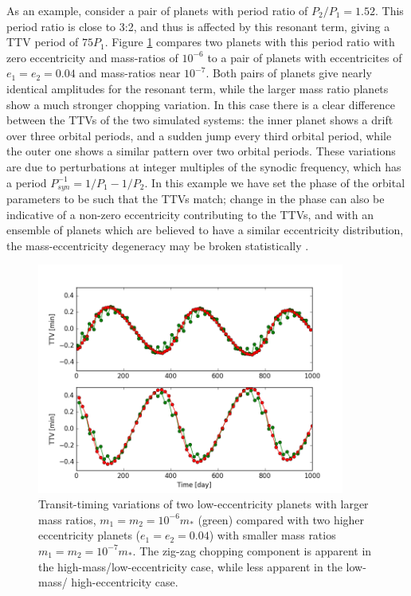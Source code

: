 \documentclass[graybox,natbib,nosecnum]{svmult}
\begin{document}
As an example, consider a pair of planets with period ratio of $P_2/P_1 = 1.52$.  This period ratio
is close to 3:2, and thus is affected by this resonant term, giving a TTV period of $75 P_1$.
Figure \ref{ttv_chopping} compares two planets with this period ratio with zero eccentricity
and mass-ratios of $10^{-6}$ to a pair of planets with eccentricites of $e_1=e_2=0.04$
and mass-ratios near $10^{-7}$.  Both pairs of planets give nearly identical amplitudes
for the resonant term, while the larger mass ratio planets show a much stronger chopping
variation.  In this case there is a clear difference between the TTVs of the two simulated
systems:  the inner planet shows a drift over three orbital periods, and a sudden jump
every third orbital period, while the outer one shows a similar pattern over two orbital
periods.  These variations are due to perturbations at integer multiples of the synodic
frequency, which has a period $P_{syn}^{-1} = 1/P_1-1/P_2$.  In this example we have
set the phase of the orbital parameters to be such that the TTVs match;  change
in the phase can also be indicative of a non-zero eccentricity contributing to the TTVs,
and with an ensemble of planets which are believed to have a similar eccentricity
distribution, the mass-eccentricity degeneracy may be broken statistically \citep{2012ApJ...761..122L,
2014ApJ...787...80H}.

\begin{figure}
\centerline{
\includegraphics[width=0.9\textwidth]{ttv_chopping.png}}
%
\caption{Transit-timing variations of two low-eccentricity planets with larger
mass ratios, $m_1 = m_2 = 10^{-6} m_*$ (green) compared with two higher eccentricity planets ($e_1=e_2=0.04$)
with smaller mass ratios $m_1 = m_2 = 10^{-7} m_*$.  The zig-zag chopping component
is apparent in the high-mass/low-eccentricity case, while less apparent in the low-mass/
high-eccentricity case.}
\label{ttv_chopping}       %
\end{figure}
\end{document}
